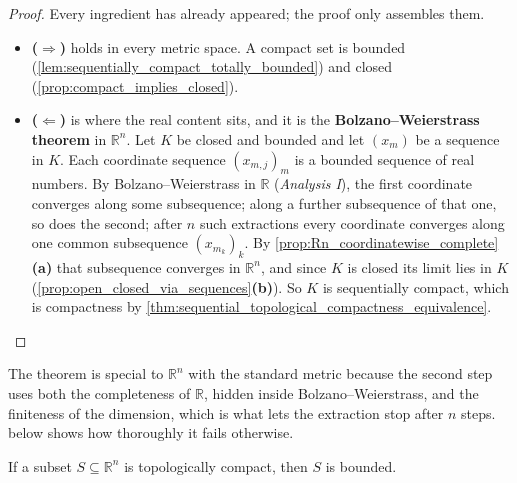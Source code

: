 \begin{proof}
Every ingredient has already appeared; the proof only assembles them.
\begin{itemize}
  \item \textbf{($\Rightarrow$)} holds in every metric space. A compact set is bounded
    (\cref{lem:sequentially_compact_totally_bounded}) and closed
    (\cref{prop:compact_implies_closed}).
  \item \textbf{($\Leftarrow$)} is where the real content sits, and it is the
    \textbf{Bolzano--Weierstrass theorem} in $\mathbb{R}^n$. Let $K$ be closed and bounded and
    let $(x_m)$ be a sequence in $K$. Each coordinate sequence $(x_{m,j})_m$ is a bounded sequence
    of real numbers. By Bolzano--Weierstrass in $\mathbb{R}$ (\emph{Analysis I}), the first
    coordinate converges along some subsequence; along a further subsequence of that one, so does
    the second; after $n$ such extractions every coordinate converges along one common
    subsequence $(x_{m_k})_k$. By \cref{prop:Rn_coordinatewise_complete}\textbf{(a)} that
    subsequence converges in $\mathbb{R}^n$, and since $K$ is closed its limit lies in $K$
    (\cref{prop:open_closed_via_sequences}\textbf{(b)}). So $K$ is sequentially compact, which is
    compactness by \cref{thm:sequential_topological_compactness_equivalence}. \qedhere
\end{itemize}
\end{proof}

The theorem is special to $\mathbb{R}^n$ with the standard metric because the second step uses
both the completeness of $\mathbb{R}$, hidden inside Bolzano--Weierstrass, and the finiteness of
the dimension, which is what lets the extraction stop after $n$ steps.
 below shows how thoroughly it fails otherwise.

\begin{proposition}
\label{prop:topologically_compact_is_bounded}
If a subset $S \subseteq \mathbb{R}^n$ is topologically compact, then $S$ is bounded.
\end{proposition}

